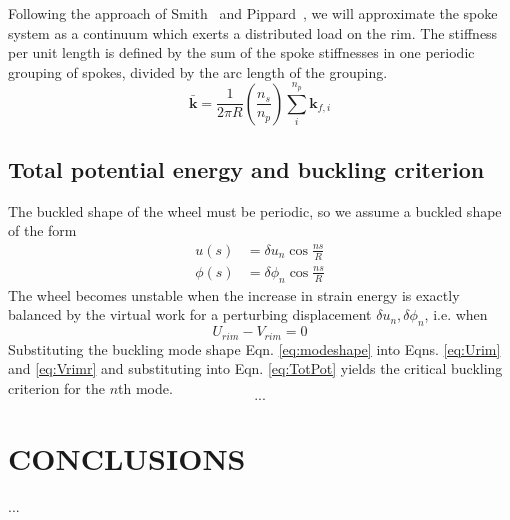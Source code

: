 \documentclass{bmd2016p}
\begin{document}
Following the approach of Smith~\cite{Smith1901a} and Pippard~\cite{Pippard1932d}, we will approximate the spoke system as a continuum which exerts a distributed load on the rim. The stiffness per unit length is defined by the sum of the spoke stiffnesses in one periodic grouping of spokes, divided by the arc length of the grouping.
\begin{equation}\label{eq:kbar}
\bar{\bm{k}} = \frac{1}{2\pi R}\left(\frac{n_s}{n_p}\right) \sum_i^{n_p} \bm{k}_{f, i}
\end{equation}


\subsection{Total potential energy and buckling criterion}
The buckled shape of the wheel must be periodic, so we assume a buckled shape of the form
\begin{equation}\label{eq:modeshape}
\begin{split}
u(s) &= \delta u_n \cos{\frac{ns}{R}} \\
\phi(s) &= \delta\phi_n \cos{\frac{ns}{R}}
\end{split}
\end{equation}
The wheel becomes unstable when the increase in strain energy is exactly balanced by the virtual work for a perturbing displacement $\delta u_n, \delta\phi_n$, i.e. when
\begin{equation}\label{eq:TotPot}
U_{rim} - V_{rim} = 0
\end{equation}
Substituting the buckling mode shape Eqn. \ref{eq:modeshape} into Eqns. \ref{eq:Urim} and \ref{eq:Vrimr} and substituting into Eqn. \ref{eq:TotPot} yields the critical buckling criterion for the $n$th mode.
\begin{equation}\label{eq:Tcrit}
...
\end{equation}
\section{CONCLUSIONS}

...



\end{document}
